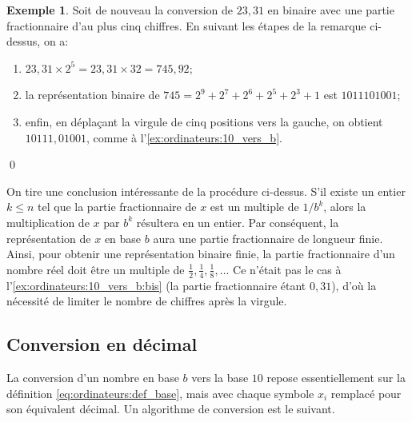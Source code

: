 \documentclass[letterpaper,11pt,english,french]{memoir}
\theoremstyle{plain}
\theoremstyle{definition}
\newtheorem{exemple}{Exemple}[chapter]
\theoremstyle{remark}
\begin{document}
\begin{exemple}
  \label{ex:ordinateurs:10_vers_b:bis}
  Soit de nouveau la conversion de $23,31$ en binaire avec une partie
  fractionnaire d'au plus cinq chiffres. En suivant les étapes de la
  remarque ci-dessus, on a:
  \begin{enumerate}
  \item $23,31 \times 2^5 = 23,31 \times 32 = 745,92$;
  \item la représentation binaire de $745 = 2^9 + 2^7 + 2^6 + 2^5 +
    2^3 + 1$ est $1011101001$;
  \item enfin, en déplaçant la virgule de cinq positions vers la
    gauche, on obtient $10111,01001$, comme à
    l'\autoref{ex:ordinateurs:10_vers_b}.
  \end{enumerate}
  \qed
\end{exemple}

On tire une conclusion intéressante de la procédure ci-dessus. S'il
existe un entier $k \leq n$ tel que la partie fractionnaire de $x$ est
un multiple de $1/b^k$, alors la multiplication de $x$ par $b^k$
résultera en un entier. Par conséquent, la représentation de $x$ en
base $b$ aura une partie fractionnaire de longueur finie. Ainsi, pour
obtenir une représentation binaire finie, la partie fractionnaire d'un
nombre réel doit être un multiple de $\frac{1}{2}, \frac{1}{4},
\frac{1}{8}, \dots$ Ce n'était pas le cas à
l'\autoref{ex:ordinateurs:10_vers_b:bis} (la partie fractionnaire
étant $0,31$), d'où la nécessité de limiter le nombre de chiffres
après la virgule.

\subsection{Conversion en décimal}
\label{sec:ordinateurs:conversion:b_vers_10}

La conversion d'un nombre en base $b$ vers la base $10$ repose
essentiellement sur la définition \eqref{eq:ordinateurs:def_base},
mais avec chaque symbole $x_i$ remplacé pour son équivalent décimal.
Un algorithme de conversion est le suivant.
\end{document}
